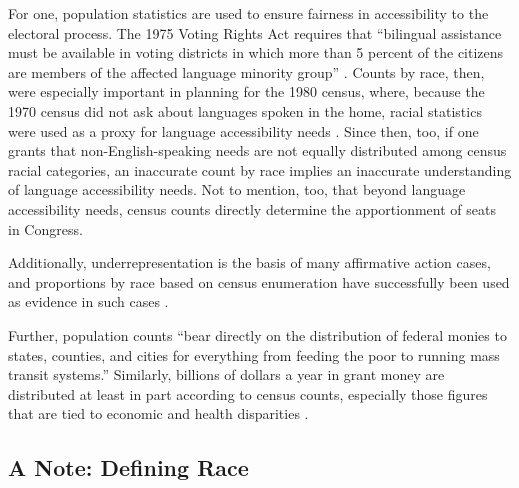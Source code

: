For one, population statistics are used to ensure fairness in accessibility to the electoral process. The 1975 Voting Rights Act requires that ``bilingual assistance must be available in voting districts in which more than 5 percent of the citizens are members of the affected language minority group'' \cite{espiritu_asian_1992}. Counts by race, then, were especially important in planning for the 1980 census, where, because the 1970 census did not ask about languages spoken in the home, racial statistics were used as a proxy for language accessibility needs \cite{keane_increasing_1985}. Since then, too, if one grants that non-English-speaking needs are not equally distributed among census racial categories, an inaccurate count by race implies an inaccurate understanding of language accessibility needs. Not to mention, too, that beyond language accessibility needs, census counts directly determine the apportionment of seats in Congress.

Additionally, underrepresentation is the basis of many affirmative action cases, and proportions by race based on census enumeration have successfully been used as evidence in such cases \cite{harris_whiteness_2003, espiritu_asian_1992, choldin_statistics_1986}.

Further, population counts ``bear directly on the distribution of federal monies to states, counties, and cities for everything from feeding the poor to running mass transit systems.''  Similarly, billions of dollars a year in grant money are distributed at least in part according to census counts, especially those figures that are tied to economic and health disparities \cite{espiritu_asian_1992}.



\subsection{A Note: Defining Race}\label{sec:defining-race}

